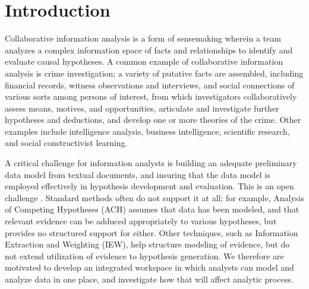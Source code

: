 \section{Introduction}\label{introduction}

Collaborative information analysis is a form of sensemaking wherein a
team analyzes a complex information space of facts and relationships to
identify and evaluate causal hypotheses. A common example of
collaborative information analysis is crime investigation; a variety of
putative facts are assembled, including financial records, witness
observations and interviews, and social connections of various sorts
among persons of interest, from which investigators collaboratively
assess means, motives, and opportunities, articulate and investigate
further hypotheses and deductions, and develop one or more theories of
the crime. Other examples include intelligence analysis, business
intelligence, scientific research, and social constructivist learning.

A critical challenge for information analysts is building an adequate
preliminary data model from textual documents, and insuring that the
data model is employed effectively in hypothesis development and
evaluation. This is an open challenge \autocite{Badalamente2005}.
Standard methods often do not support it at all; for example, Analysis
of Competing Hypotheses (ACH) assumes that data has been modeled, and
that relevant evidence can be adduced appropriately to various
hypotheses, but provides no structured support for either. Other
techniques, such as Information Extraction and Weighting (IEW), help
structure modeling of evidence, but do not extend utilization of
evidence to hypothesis generation. We therefore are motivated to develop
an integrated workspace in which analysts can model and analyze data in
one place, and investigate how that will affect analytic process.

